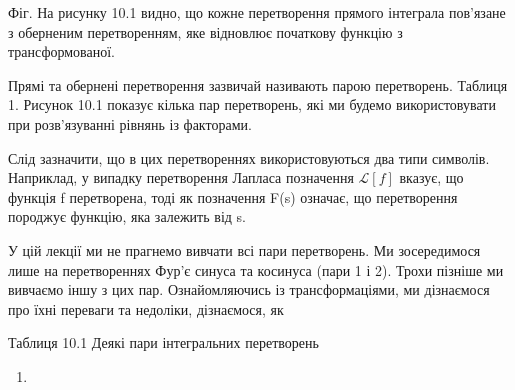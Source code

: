 \documentclass[
  ukrainian,
]{article}
\providecommand{\tightlist}{%
  \setlength{\itemsep}{0pt}\setlength{\parskip}{0pt}}
\begin{document}
Фіг. На рисунку 10.1 видно, що кожне перетворення прямого інтеграла
пов'язане з оберненим перетворенням, яке відновлює початкову функцію з
трансформованої.

Прямі та обернені перетворення зазвичай називають парою перетворень.
Таблиця 1. Рисунок 10.1 показує кілька пар перетворень, які ми будемо
використовувати при розв'язуванні рівнянь із факторами.

Слід зазначити, що в цих перетвореннях використовуються два типи
символів. Наприклад, у випадку перетворення Лапласа позначення
\(\mathcal{L}[f]\) вказує, що функція f перетворена, тоді як позначення
F(s) означає, що перетворення породжує функцію, яка залежить від s.

У цій лекції ми не прагнемо вивчати всі пари перетворень. Ми
зосередимося лише на перетвореннях Фур'є синуса та косинуса (пари 1 і
2). Трохи пізніше ми вивчаємо іншу з цих пар. Ознайомляючись із
трансформаціями, ми дізнаємося про їхні переваги та недоліки,
дізнаємося, як

Таблиця 10.1 Деякі пари інтегральних перетворень

\begin{enumerate}
\def\labelenumi{\arabic{enumi}.}
\tightlist
\item
\end{enumerate}
\end{document}
